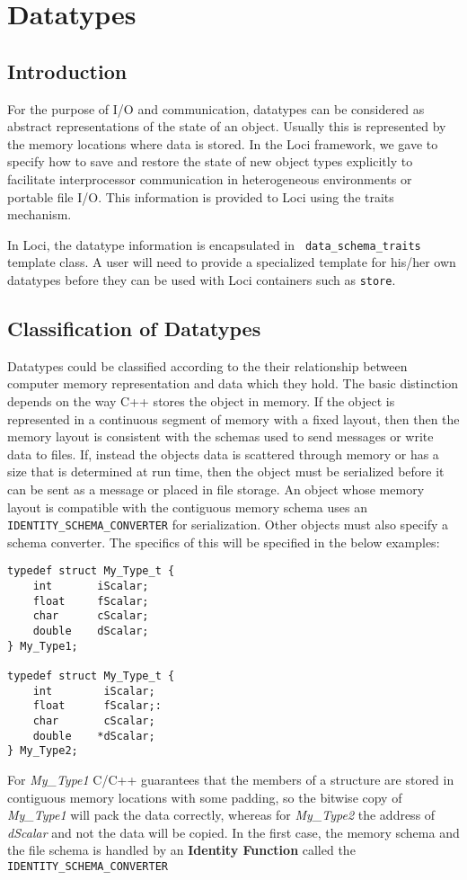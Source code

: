 \chapter{Datatypes }
%
\section {Introduction}
For the purpose of I/O and communication, datatypes can be considered
as abstract representations of the state of an object.  Usually this
is represented by the memory locations where data is stored.  In the
Loci framework, we gave to specify how to save and restore the state
of new object types explicitly to facilitate interprocessor
communication in heterogeneous environments or portable file I/O.
This information is provided to Loci using the traits mechanism.

In Loci, the datatype information is encapsulated in {\tt
  data\_schema\_traits} template class.  A user will need to provide a
specialized template for his/her own datatypes before they can be
used with Loci containers such as {\tt store}.
%
\section {Classification of Datatypes} 

Datatypes could be classified according to the their relationship
between computer memory representation and data which they hold.  The
basic distinction depends on the way C++ stores the object in memory.
If the object is represented in a continuous segment of memory with a
fixed layout, then then the memory layout is consistent with the
schemas used to send messages or write data to files.  If, instead the
objects data is scattered through memory or has a size that is
determined at run time, then the object must be serialized before it
can be sent as a message or placed in file storage.  An object whose
memory layout is compatible with the contiguous memory schema uses an
{\tt IDENTITY\_SCHEMA\_CONVERTER} for serialization.  Other objects
must also specify a schema converter.  The specifics of this will be
specified in the below examples:
%
\begin {verbatim}
typedef struct My_Type_t {
    int       iScalar;
    float     fScalar;
    char      cScalar;
    double    dScalar;
} My_Type1;

typedef struct My_Type_t {
    int        iScalar;
    float      fScalar;:
    char       cScalar;
    double    *dScalar;
} My_Type2;
\end{verbatim}
%
For {\em My\_Type1} C/C++ guarantees that the members of a structure
are stored in contiguous memory locations with some padding, so the
bitwise copy of {\em My\_Type1} will pack the data correctly, whereas
for {\em My\_Type2} the address of {\em dScalar} and not the data will
be copied. In the first case, the memory schema and the file schema is
handled by an {\bf Identity Function} called the {\tt
  IDENTITY\_SCHEMA\_CONVERTER }

